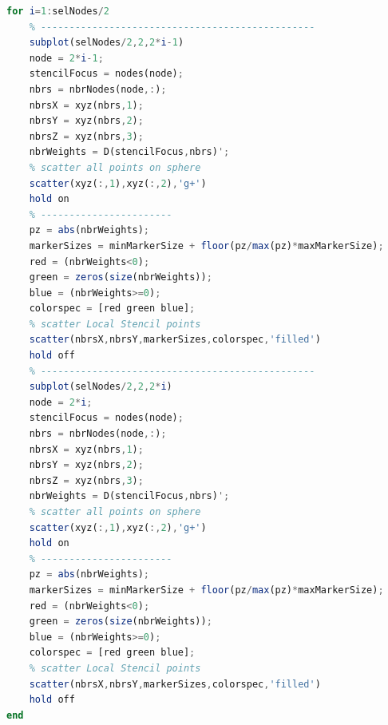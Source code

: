 \documentclass[11pt]{article}
\begin{document}
\begin{lstlisting}[language=octave]
for i=1:selNodes/2
    % ------------------------------------------------
    subplot(selNodes/2,2,2*i-1)
    node = 2*i-1;
    stencilFocus = nodes(node);
    nbrs = nbrNodes(node,:);
    nbrsX = xyz(nbrs,1);
    nbrsY = xyz(nbrs,2);
    nbrsZ = xyz(nbrs,3);
    nbrWeights = D(stencilFocus,nbrs)';
    % scatter all points on sphere
    scatter(xyz(:,1),xyz(:,2),'g+')
    hold on
    % -----------------------
    pz = abs(nbrWeights);
    markerSizes = minMarkerSize + floor(pz/max(pz)*maxMarkerSize);
    red = (nbrWeights<0);
    green = zeros(size(nbrWeights));
    blue = (nbrWeights>=0);
    colorspec = [red green blue];
    % scatter Local Stencil points
    scatter(nbrsX,nbrsY,markerSizes,colorspec,'filled')
    hold off
    % ------------------------------------------------
    subplot(selNodes/2,2,2*i)
    node = 2*i;
    stencilFocus = nodes(node);
    nbrs = nbrNodes(node,:);
    nbrsX = xyz(nbrs,1);
    nbrsY = xyz(nbrs,2);
    nbrsZ = xyz(nbrs,3);
    nbrWeights = D(stencilFocus,nbrs)';
    % scatter all points on sphere
    scatter(xyz(:,1),xyz(:,2),'g+')
    hold on
    % -----------------------
    pz = abs(nbrWeights);
    markerSizes = minMarkerSize + floor(pz/max(pz)*maxMarkerSize);
    red = (nbrWeights<0);
    green = zeros(size(nbrWeights));
    blue = (nbrWeights>=0);
    colorspec = [red green blue];
    % scatter Local Stencil points
    scatter(nbrsX,nbrsY,markerSizes,colorspec,'filled')
    hold off
end
\end{lstlisting}
\end{document}
